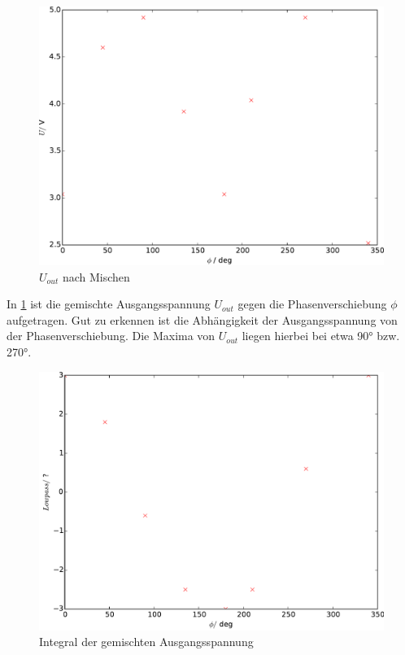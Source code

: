 \begin{figure}
  \centering
  \includegraphics[width=\textwidth]{plot2u.pdf}
  \caption{$U_{out}$ nach Mischen}
  \label{fig:plot2u}
\end{figure}

In \ref{fig:plot2u} ist die gemischte Ausgangsspannung $U_{out}$ gegen die
Phasenverschiebung $\phi$ aufgetragen. Gut zu erkennen ist die Abhängigkeit
der Ausgangsspannung von der Phasenverschiebung. Die Maxima von $U_{out}$
liegen hierbei bei etwa 90° bzw. 270°.

\begin{figure}
  \centering
  \includegraphics[width=\textwidth]{plot2low.pdf}
  \caption{Integral der gemischten Ausgangsspannung}
  \label{fig:plot2low}
\end{figure}

